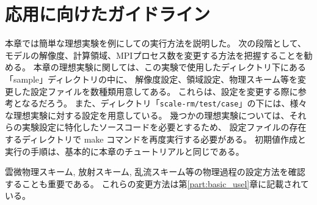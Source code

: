 \section{応用に向けたガイドライン} \label{sec:ideal_exp_last}

本章では簡単な理想実験を例にして{\scalerm}の実行方法を説明した。
次の段階として、モデルの解像度、計算領域、MPIプロセス数を変更する方法を把握することを勧める。
本章の理想実験に関しては、この実験で使用したディレクトリ下にある「sample」ディレクトリの中に、
解像度設定、領域設定、物理スキーム等を変更した設定ファイルを数種類用意してある。
これらは、設定を変更する際に参考となるだろう。
また、ディレクトリ「\verb|scale-rm/test/case|」の下には、様々な理想実験に対する設定を用意している。
幾つかの理想実験については、それらの実験設定に特化したソースコードを必要とするため、
設定ファイルの存在するディレクトリで make コマンドを再度実行する必要がある。
初期値作成と実行の手順は、基本的に本章のチュートリアルと同じである。

雲微物理スキーム, 放射スキーム, 乱流スキーム等の物理過程の設定方法を確認することも重要である。
これらの変更方法は第\ref{part:basic_usel}章に記載されている。
